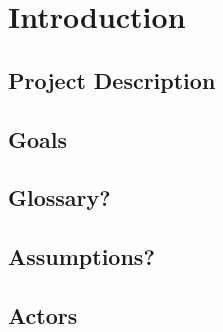 \chapter{Introduction}
	\section{Project Description}

	\section{Goals}

	\section{Glossary?}

	\section{Assumptions?}

	\section{Actors}